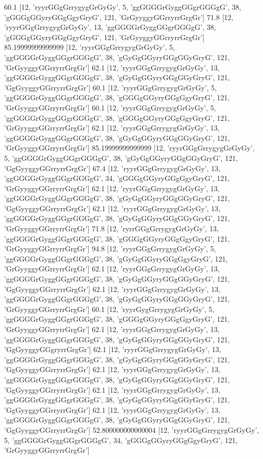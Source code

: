 60.1 [12, 'ryyrGGgGrrygygGrGyGy', 5, 'ggGGGGrGyggGGgrGGGgG', 38, 'gGGGgGGyryGGgGgyGryG', 121, 'GrGyyggyGGrryrrGrgGr']
71.8 [12, 'ryyrGGgGrrygygGrGyGy', 13, 'ggGGGGrGyggGGgrGGGgG', 38, 'gGGGgGGyryGGgGgyGryG', 121, 'GrGyyggyGGrryrrGrgGr']
85.19999999999999 [12, 'ryyrGGgGrrygygGrGyGy', 5, 'ggGGGGrGyggGGgrGGGgG', 38, 'gGyGgGGyryGGgGGyGryG', 121, 'GrGyyggyGGrryrrGrgGr']
62.1 [12, 'ryyrGGgGrrygygGrGyGy', 13, 'ggGGGGrGyggGGgrGGGgG', 38, 'gGyGgGGyryGGgGGyGryG', 121, 'GgGyyggyGGrryrrGrgGr']
60.1 [12, 'ryyrGGgGrrygygGrGyGy', 5, 'ggGGGGrGyggGGgrGGGgG', 38, 'gGGGgGGyryGGgGgyGryG', 121, 'GrGyyggyGGrryrrGrgGr']
60.1 [12, 'ryyrGGgGrrygygGrGyGy', 5, 'ggGGGGrGyggGGgrGGGgG', 38, 'gGGGgGGyryGGgGgyGryG', 121, 'GrGyyggyGGrryrrGrgGr']
62.1 [12, 'ryyrGGgGrrygygGrGyGy', 13, 'ggGGGGrGyggGGgrGGGgG', 38, 'gGyGgGGyryGGgGGyGryG', 121, 'GrGyyggyGGrryrrGrgGr']
85.19999999999999 [12, 'ryyrGGgGrrygygGrGyGy', 5, 'ggGGGGrGyggGGgrGGGgG', 38, 'gGyGgGGyryGGgGGyGryG', 121, 'GgGyyggyGGrryrrGrgGr']
67.4 [12, 'ryyrGGgGrrygygGrGyGy', 13, 'ggGGGGrGyggGGgrGGGgG', 34, 'gGGGgGGyryGGgGgyGryG', 121, 'GrGyyggyGGrryrrGrgGr']
62.1 [12, 'ryyrGGgGrrygygGrGyGy', 13, 'ggGGGGrGyggGGgrGGGgG', 38, 'gGyGgGGyryGGgGGyGryG', 121, 'GgGyyggyGGrryrrGrgGr']
62.1 [12, 'ryyrGGgGrrygygGrGyGy', 13, 'ggGGGGrGyggGGgrGGGgG', 38, 'gGyGgGGyryGGgGGyGryG', 121, 'GrGyyggyGGrryrrGrgGr']
71.8 [12, 'ryrrGGgGrrygygGrGyGy', 13, 'ggGGGGrGyggGGgrGGGgG', 38, 'gGGGgGGyryGGgGgyGryG', 121, 'GrGyyggyGGrryrrGrgGr']
94.8 [12, 'ryyrGGgGrrygygGrGyGy', 5, 'ggGGGGrGyggGGgrGGGgG', 38, 'gGyGgGGyryGGgGgyGryG', 121, 'GrGyyggyGGrryrrGrgGr']
62.1 [12, 'ryyrGGgGrrygygGrGyGy', 13, 'ggGGGGrGyggGGgrGGGgG', 38, 'gGyGgGGyryGGgGGyGryG', 121, 'GgGyyggyGGrryrrGrgGr']
62.1 [12, 'ryyrGGgGrrygygGrGyGy', 13, 'ggGGGGrGyggGGgrGGGgG', 38, 'gGyGgGGyryGGgGGyGryG', 121, 'GrGyyggyGGrryrrGrgGr']
60.1 [12, 'ryyrGygGrrygygGrGyGy', 5, 'ggGGGGrGyggGGgrGGGgG', 38, 'gGGGgGGyryGGgGgyGryG', 121, 'GrGyyggyGGrryrrGrgGr']
62.1 [12, 'ryyrGGgGrrygygGrGyGy', 13, 'ggGGGGrGyggGGgrGGGgG', 38, 'gGyGgGGyryGGgGGyGryG', 121, 'GgGyyggyGGgryrrGrgGr']
62.1 [12, 'ryyrGGgGrrygygGrGyGy', 13, 'ggGGGGrGyggGGgrGGGgG', 38, 'gGyGgGGyryGGgGGyGryG', 121, 'GgGyyggyGGrryrrGrgGr']
62.1 [12, 'ryyrGGgGrrygygGrGyGy', 13, 'ggGGGGrGyggGGgrGGGgG', 38, 'gGyGgGGyryGGgGGyGryG', 121, 'GgGyyggyGGrryrrGrgGr']
62.1 [12, 'ryyrGGgGrrygygGrGyGy', 13, 'ggGGGGrGyggGGgrGGGgG', 38, 'gGyGgGGyryGGgGGyGryG', 121, 'GgGyyggyGGrryrrGrgGr']
62.1 [12, 'ryyrGGgGrrygygGrGyGy', 13, 'ggGGGGrGyggGGgrGGGgG', 38, 'gGyGgGGyryGGgGGyGryG', 121, 'GgGyyggyGGrryrrGrgGr']
52.800000000000004 [12, 'ryyrGGgGrrygygGrGyGy', 5, 'ggGGGGrGyggGGgrGGGgG', 34, 'gGGGgGGyryGGgGgyGryG', 121, 'GrGyyggyGGrryrrGrgGr']
